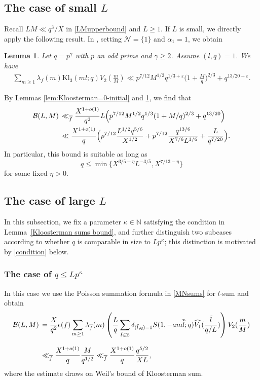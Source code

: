\documentclass[11pt,reqno]{amsart}
\newcommand{\bna}{\begin{eqnarray*}}
\newcommand{\ena}{\end{eqnarray*}}
\numberwithin{equation}{section}
\theoremstyle{plain}
\newtheorem{lemma}{Lemma}[section]
\theoremstyle{definition}
\newcommand{\Kl}{\mathrm{Kl}}
\begin{document}
\subsection{The case of small $L$}
Recall $LM\ll q^3/X$ in \eqref{LMupperbound} and $L\geq 1$.
If $L$ is small, we directly apply the following result.
In \cite[Theorem 1.3]{Sharma}, setting $\mathcal{N}=\{1\}$ and $\alpha_1=1$, we obtain
\begin{lemma}\label{sharma}
Let $q=p^\gamma$ with $p$ an odd prime and $\gamma \geq 2$. Assume $(l,q)=1$. We have
\bna
\sum_{m \geq 1}\lambda_f(m)\Kl_3(ml; q) V_2(\frac{m}{M}) 
\ll p^{7/12}M^{1/2}q^{1/3+\varepsilon}\bigg(1+\frac{M}{q}\bigg)^{2/3}+q^{13/20+\varepsilon}.
\ena
\end{lemma}
By Lemmas \ref{lem:Kloosterman=0-initial} and \ref{sharma}, we find that
\begin{align}\label{upbound1}
\mathcal{B}(L, M) & \,\ll_{\overline{f}} \frac{X^{1+o(1)}}{q^2}L
\Bigl(p^{7/12}M^{1/2}q^{1/3}(1+M/q)^{2/3}+q^{13/20}\Bigr) \notag\\
& \, \ll \frac{X^{1+o(1)}}{q}\Bigl(p^{7/12}\frac{L^{1/2}q^{5/6}}{X^{1/2}}+p^{7/12}\frac{q^{13/6}}{X^{7/6}L^{1/6}}
+\frac{L}{q^{7/20}}\Bigr).
\end{align}
In particular, this bound is suitable as long as
$$q\leq \min\{X^{3/5-\eta}L^{-3/5}, X^{7/13-\eta}\}$$
for some fixed $\eta>0$.

\subsection{The case of large $L$}
In this subsection, we fix a parameter $\kappa\in\mathbb{N}$ 
satisfying the condition in Lemma~\ref{Kloosterman sums bound},
and further distinguish two subcases according to whether $q$ is comparable  
in size to $Lp^{\kappa}$; this distinction is motivated by \eqref{condition} below.
\subsubsection{The case of $q \leq Lp^{\kappa}$}
In this case we use the Poisson summation formula in \eqref{MNsums} for $l$-sum and obtain
\begin{align}
\mathcal{B}(L, M) 
&\,=\frac{X}{q^2}\epsilon(f)\sum_{m\geq 1}\lambda_{\overline{f}}(m)
\left(\frac{L}{q}\sum_{\tilde{l}\in \mathbb{Z}}
\delta_{(\tilde l,q)=1}S(1,-am\overline{\tilde{l}};q)
\widehat{V_1}(\frac{\tilde{l}}{q/L})\right)V_2(\frac{m}{M})
\nonumber\\\noalign{\vskip 2,8mm}
&\,\ll_{\overline{f}}
\frac{X^{1+o(1)}}{q}\frac{M}{q^{1/2}}\ll_{\overline{f}} \frac{X^{1+o(1)}}{q}\frac{q^{5/2}}{XL},\label{MNbound2}
\end{align}
 where the estimate draws on Weil's bound of Kloosterman sum.
\end{document}
